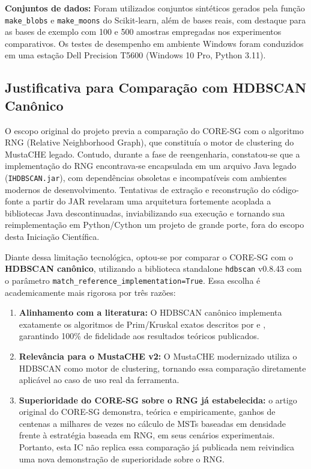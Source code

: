 \documentclass[12pt,a4paper,oneside]{article}
\begin{document}
\textbf{Conjuntos de dados:} Foram utilizados conjuntos sintéticos gerados pela função
\texttt{make\_blobs} e \texttt{make\_moons} do Scikit-learn, além de bases reais, com destaque
para as bases de exemplo com 100 e 500 amostras empregadas nos experimentos comparativos.
Os testes de desempenho em ambiente Windows foram conduzidos em uma estação Dell Precision
T5600 (Windows 10 Pro, Python 3.11).

\subsection{Justificativa para Comparação com HDBSCAN Canônico}

O escopo original do projeto previa a comparação do CORE-SG com o algoritmo RNG (Relative
Neighborhood Graph), que constituía o motor de clustering do MustaCHE legado. Contudo, durante
a fase de reengenharia, constatou-se que a implementação do RNG encontrava-se encapsulada em um
arquivo Java legado (\texttt{IHDBSCAN.jar}), com dependências obsoletas e incompatíveis com
ambientes modernos de desenvolvimento. Tentativas de extração e reconstrução do código-fonte
a partir do JAR revelaram uma arquitetura fortemente acoplada a bibliotecas Java descontinuadas,
inviabilizando sua execução e tornando sua reimplementação em Python/Cython um projeto de
grande porte, fora do escopo desta Iniciação Científica.

Diante dessa limitação tecnológica, optou-se por comparar o CORE-SG com o \textbf{HDBSCAN
canônico}, utilizando a biblioteca standalone \texttt{hdbscan} v0.8.43 com o parâmetro
\texttt{match\_reference\_implementation=True}. Essa escolha é academicamente mais rigorosa por
três razões:

\begin{enumerate}
  \item \textbf{Alinhamento com a literatura:} O HDBSCAN canônico implementa exatamente os
        algoritmos de Prim/Kruskal exatos descritos por \textcite{campello2013framework} e
        \textcite{campello2015hierarchical}, garantindo 100\% de fidelidade aos resultados
        teóricos publicados.
  \item \textbf{Relevância para o MustaCHE v2:} O MustaCHE modernizado utiliza o HDBSCAN como
        motor de clustering, tornando essa comparação diretamente aplicável ao caso de uso real
        da ferramenta.
  \item \textbf{Superioridade do CORE-SG sobre o RNG já estabelecida:} o artigo original do
        CORE-SG \cite{naldi2022coresg} demonstra, teórica e empiricamente, ganhos de centenas
        a milhares de vezes no cálculo de MSTs baseadas em densidade frente à estratégia baseada
        em RNG, em seus cenários experimentais. Portanto, esta IC não replica essa comparação
        já publicada nem reivindica uma nova demonstração de superioridade sobre o RNG.
\end{enumerate}
\end{document}

